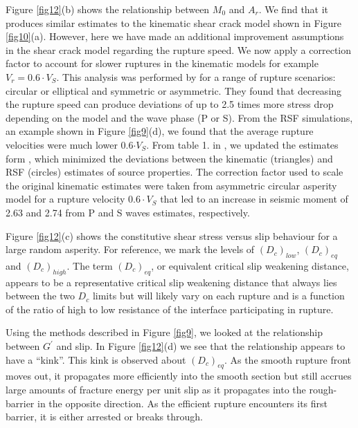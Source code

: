 \documentclass[preprint,1p, 10pt,authoryear]{elsarticle}
\begin{document}
Figure \ref{fig12}(b) shows the relationship between $M_{0}$ and $A_{r}$. We find that it produces similar estimates to the kinematic shear crack model shown in Figure \ref{fig10}(a). However, here we have made an additional improvement assumptions in the shear crack model regarding the rupture speed.  We now apply a correction factor to account for slower ruptures in the kinematic models for example $V_{r} = 0.6\cdot V_{S}$.  This analysis was performed by \citet{Kaneko2015} for a range of rupture scenarios: circular or elliptical and symmetric or asymmetric.  They found that decreasing the rupture speed can produce deviations of up to 2.5 times more stress drop depending on the model and the wave phase (P or S).  From the RSF simulations, an example shown in Figure \ref{fig9}(d), we found that the average rupture velocities were much lower 0.6$\cdot V_{S}$.  From table 1. in \citet{Kaneko2015}, we updated the estimates form \citet{Selvadurai2019}, which minimized the deviations between the kinematic (triangles) and RSF (circles) estimates of source properties.  The correction factor used to scale the original kinematic estimates were taken from asymmetric circular asperity model for a rupture velocity $0.6\cdot V_{S}$ that led to an increase in seismic moment of 2.63 and 2.74 from P and S waves estimates, respectively.

Figure \ref{fig12}(c) shows the constitutive shear stress versus slip behaviour for a large random asperity. For reference, we mark the levels of $(D_{c})_{low}$, $(D_{c})_{eq}$ and $(D_{c})_{high}$.  The term $(D_{c})_{eq}$, or equivalent critical slip weakening distance, appears to be a representative critical slip weakening distance that always lies between the two $D_{c}$ limits but will likely vary on each rupture and is a function of the ratio of high to low resistance of the interface participating in rupture.

Using the methods described in Figure \ref{fig9}, we looked at the relationship between $G^{'}$ and slip. In Figure \ref{fig12}(d) we see that the relationship appears to have a ``kink''.  This kink is observed about $(D_{c})_{eq}$. As the smooth rupture front moves out, it propagates more efficiently into the smooth section but still accrues large amounts of fracture energy per unit slip as it propagates into the rough-barrier in the opposite direction. As the efficient rupture encounters its first barrier, it is either arrested or breaks through. 
\end{document}
